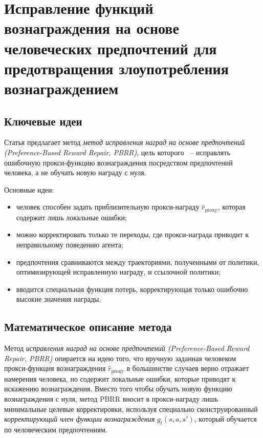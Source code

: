 \section{Исправление функций вознаграждения на основе человеческих предпочтений для предотвращения злоупотребления вознаграждением}

\subsection{Ключевые идеи}

Статья \cite{hatgiskessell2025pbr} предлагает метод 
\emph{метод исправления наград на основе предпочтений 
(Preference-Based Reward Repair, PBRR)}, цель которого ~-- исправлять ошибочную 
прокси-функцию вознаграждения посредством предпочтений человека, а не обучать 
новую награду с нуля.

Основные идеи:

\begin{itemize}
    \item человек способен задать приблизительную прокси-награду 
    $\hat r_{\text{proxy}}$, которая содержит лишь локальные ошибки;
    \item можно корректировать только те переходы, где прокси-награда приводит к 
          неправильному поведению агента;
    \item предпочтения сравниваются между траекториями, полученными от 
          политики, оптимизирующей исправленную награду, и ссылочной политики;
    \item вводится специальная функция потерь, корректирующая только ошибочно 
    высокие значения награды.
\end{itemize}

\subsection{Математическое описание метода}

Метод \emph{исправления наград на основе предпочтений 
(Preference-Based Reward Repair, PBRR)} опирается на идею того, что вручную 
заданная человеком прокси-функция вознаграждения $\hat r_{\text{proxy}}$ 
в большинстве случаев верно отражает намерения человека, но содержит 
локальные ошибки, которые приводят к искажению вознаграждения. 
Вместо того чтобы обучать новую функцию вознаграждения с нуля, 
метод PBRR вносит в прокси-награду лишь минимальные целевые корректировки, 
используя специально сконструированный \emph{корректирующий член функции 
вознаграждения} $g_t(s,a,s')$, который обучается по человеческим предпочтениям.

